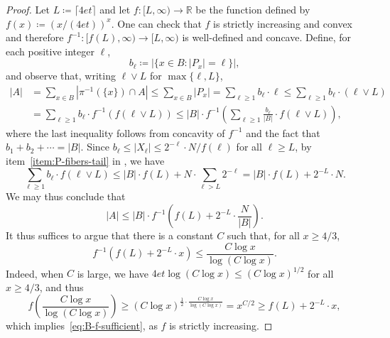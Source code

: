 \documentclass[10pt,a4paper]{amsart}
\begin{document}
\begin{proof}
  Let $L \coloneqq \lceil 4et \rceil$ and let $f \colon [L, \infty) \to \mathbb{R}$ be the function defined by $f(x) \coloneqq (x/(4et))^x$.  One can check that $f$ is strictly increasing and convex and therefore $f^{-1} \colon [f(L), \infty) \to [L, \infty)$ is well-defined and concave.
  Define, for each positive integer $\ell$,
  \[
    b_\ell \coloneqq |\{x \in B : |P_x| = \ell\}|,
  \]
  and observe that, writing $\ell \vee L$ for $\max\{\ell, L\}$,
  \[
    \begin{split}
      |A|
      & = \sum_{x \in B} |\pi^{-1}(\{x\}) \cap A| \le \sum_{x \in B} |P_x| = \sum_{\ell \ge 1}b_\ell\cdot \ell \le \sum_{\ell \ge 1} b_\ell \cdot (\ell \vee L) \\
      & = \sum_{\ell \ge 1} b_\ell \cdot f^{-1}(f(\ell \vee L)) \le |B| \cdot f^{-1}\left( \sum_{\ell \ge 1} \frac{b_\ell}{|B|} \cdot f(\ell \vee L)\right),
    \end{split}
  \]
  where the last inequality follows from concavity of $f^{-1}$ and the fact that $b_1 + b_2 + \dotsb = |B|$.
  Since $b_{\ell}\leq |X_{\ell}|\leq 2^{-\ell} \cdot N / f(\ell)$ for all $\ell\geq L$, by item~\ref{item:P-fibers-tail} in , we have
  \[
    \sum_{\ell \ge 1} b_\ell \cdot f(\ell \vee L) \le |B| \cdot f(L) + N \cdot \sum_{\ell > L} 2^{-\ell} = |B| \cdot f(L) + 2^{-L} \cdot N.
  \]
  We may thus conclude that
  \[
    |A| \le |B| \cdot f^{-1}\left(f(L) + 2^{-L} \cdot \frac{N}{|B|}\right).
  \]
  It thus suffices to argue that there is a constant $C$ such that, for all $x \ge 4/3$,
  \begin{equation}
    \label{eq:B-f-sufficient}
    f^{-1} \left( f(L) + 2^{-L} \cdot x \right) \le \frac{ C\log x}{\log (C\log x)}.
  \end{equation}
  Indeed, when $C$ is large, we have $4et \log (C \log x) \le (C \log x)^{1/2}$ for all $x \ge 4/3$, and thus
  \[
    f\left(\frac{ C\log x}{\log (C\log x)}\right) \ge \left(C \log x\right)^{\frac{1}{2} \cdot \frac{C \log x}{\log (C \log x)}} = x^{C/2} \ge f(L) + 2^{-L} \cdot x,
  \]
  which implies~\eqref{eq:B-f-sufficient}, as $f$ is strictly increasing.
\end{proof}
\end{document}
